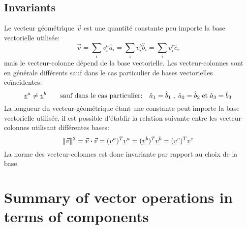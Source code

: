 \subsection{Invariants} 
%
Le vecteur géométrique $\vec{v}$ est une quantité constante peu importe la base vectorielle utilisée: 
\begin{equation}
\vec{v} = \sum_{i} v_i^a \hat{a}_i = \sum_{i} v_i^b \hat{b}_i = \sum_{i} v_i^c \hat{c}_i
\end{equation}
mais le vecteur-colonne dépend de la base vectorielle. Les vecteur-colonnes sont en générale différents sauf dans le cas particulier de bases vectorielles coïncidentes:
\begin{equation}
\underline{v}^{a} \ne \underline{v}^{b} \quad\quad \text{sauf dans le cas particulier:} \quad \hat{a}_1 = \hat{b}_1 \;,\; \hat{a}_2 = \hat{b}_2  \;\text{et}\; \hat{a}_3 = \hat{b}_3 
\end{equation} 
La longueur du vecteur-géométrique étant une constante peut importe la base vectorielle utilisée, il est possible d'établir la relation suivante entre les vecteur-colonnes utilisant différentes bases:
\begin{equation}
\|\vec{v}\|^2 = \vec{v} \boldsymbol{\cdot} \vec{v} = (\underline{v}^{a})^T \underline{v}^{a} = (\underline{v}^{b})^T \underline{v}^{b} = (\underline{v}^{c})^T \underline{v}^{c}
\end{equation}
La norme des vecteur-colonnes est donc invariante par rapport au choix de la base. 






\newpage
\section{Summary of vector operations in terms of components}
\label{sec:vectoropindex}

